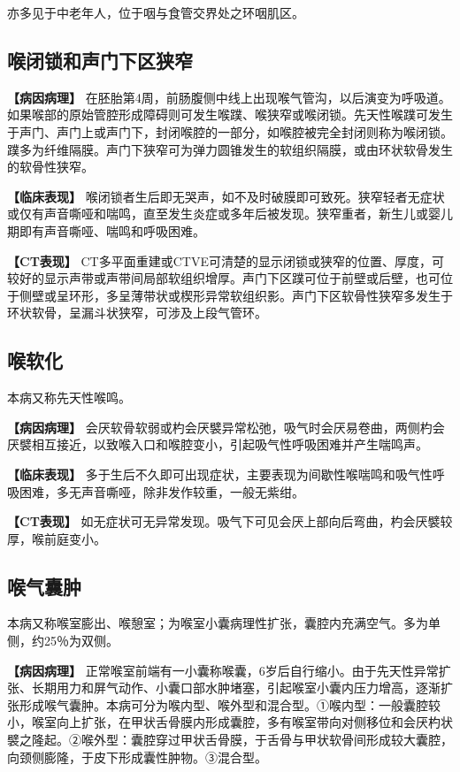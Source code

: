 亦多见于中老年人，位于咽与食管交界处之环咽肌区。

\subsection{喉闭锁和声门下区狭窄}

\textbf{【病因病理】}
在胚胎第4周，前肠腹侧中线上出现喉气管沟，以后演变为呼吸道。如果喉部的原始管腔形成障碍则可发生喉蹼、喉狭窄或喉闭锁。先天性喉蹼可发生于声门、声门上或声门下，封闭喉腔的一部分，如喉腔被完全封闭则称为喉闭锁。蹼多为纤维隔膜。声门下狭窄可为弹力圆锥发生的软组织隔膜，或由环状软骨发生的软骨性狭窄。

\textbf{【临床表现】}
喉闭锁者生后即无哭声，如不及时破膜即可致死。狭窄轻者无症状或仅有声音嘶哑和喘鸣，直至发生炎症或多年后被发现。狭窄重者，新生儿或婴儿期即有声音嘶哑、喘鸣和呼吸困难。

\textbf{【CT表现】}
CT多平面重建或CTVE可清楚的显示闭锁或狭窄的位置、厚度，可较好的显示声带或声带间局部软组织增厚。声门下区蹼可位于前壁或后壁，也可位于侧壁或呈环形，多呈薄带状或楔形异常软组织影。声门下区软骨性狭窄多发生于环状软骨，呈漏斗状狭窄，可涉及上段气管环。

\subsection{喉软化}

本病又称先天性喉鸣。

\textbf{【病因病理】}
会厌软骨软弱或杓会厌襞异常松弛，吸气时会厌易卷曲，两侧杓会厌襞相互接近，以致喉入口和喉腔变小，引起吸气性呼吸困难并产生喘鸣声。

\textbf{【临床表现】}
多于生后不久即可出现症状，主要表现为间歇性喉喘鸣和吸气性呼吸困难，多无声音嘶哑，除非发作较重，一般无紫绀。

\textbf{【CT表现】}
如无症状可无异常发现。吸气下可见会厌上部向后弯曲，杓会厌襞较厚，喉前庭变小。

\subsection{喉气囊肿}

本病又称喉室膨出、喉憩室；为喉室小囊病理性扩张，囊腔内充满空气。多为单侧，约25％为双侧。

\textbf{【病因病理】}
正常喉室前端有一小囊称喉囊，6岁后自行缩小。由于先天性异常扩张、长期用力和屏气动作、小囊口部水肿堵塞，引起喉室小囊内压力增高，逐渐扩张形成喉气囊肿。本病可分为喉内型、喉外型和混合型。①喉内型：一般囊腔较小，喉室向上扩张，在甲状舌骨膜内形成囊腔，多有喉室带向对侧移位和会厌杓状襞之隆起。②喉外型：囊腔穿过甲状舌骨膜，于舌骨与甲状软骨间形成较大囊腔，向颈侧膨隆，于皮下形成囊性肿物。③混合型。

